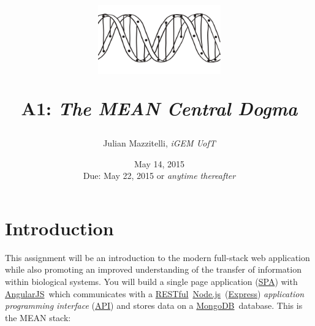 
\graphicspath{ {./figures/} }

\title{%
    \begin{center} \includegraphics[width=150pt]{dna} \end{center}
    A1: \textit{The MEAN Central Dogma}}
\author{Julian Mazzitelli, \textit{iGEM UofT} 
}
\date{May 14, 2015 \\ \vspace{5pt}
{\small Due: May 22, 2015 or \textit{anytime thereafter} }}

\hypersetup{
    colorlinks=true,
    urlcolor=TealBlue
}

\def\AngularJS{\href{https://angularjs.org/}{AngularJS}}
\def\RESTful{\href{http://en.wikipedia.org/wiki/Representational_state_transfer}{RESTful}}
\def\NodeJS{\href{https://nodejs.org/}{Node.js}}
\def\ExpressJS{\href{http://expressjs.com/}{Express}}
\def\API{\href{http://en.wikipedia.org/wiki/Application_programming_interface}{API}}
\def\MongoDB{\href{https://www.mongodb.org/}{MongoDB}}
\def\SPA{\href{http://en.wikipedia.org/wiki/Single-page_application}{SPA}}
\def\centraldogma{\href{http://en.wikipedia.org/wiki/Central_dogma_of_molecular_biology}{central dogma}}
\def\pythondna{\href{https://github.com/igemuoftATG/tutorials/tree/master/Python/\%5B03\%5DDNA!}{Python DNA!}}
\def\javascripting{\href{https://github.com/sethvincent/javascripting}{javascripting}}
\def\learnyounode{\href{https://github.com/workshopper/learnyounode}{learnyounode}}
\def\expressworks{\href{https://github.com/azat-co/expressworks}{expressworks}}


\reversemarginpar

\maketitle

\section{Introduction}

This assignment will be an introduction to the modern full-stack web application
while also promoting an improved understanding of the transfer of information
within biological systems. You will build a single page application (\SPA) with
\AngularJS\ which communicates with a \RESTful\ \NodeJS\ (\ExpressJS)
\textit{application programming interface} (\API) and stores data on a \MongoDB\
database. This is the MEAN stack:

